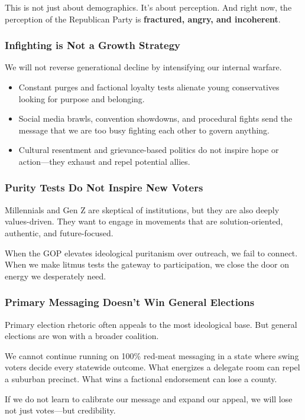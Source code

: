 This is not just about demographics. It’s about perception. And right now, the perception of the Republican Party is \textbf{fractured, angry, and incoherent}.

\subsubsection{Infighting is Not a Growth Strategy}
We will not reverse generational decline by intensifying our internal warfare.

\begin{itemize}
\item Constant purges and factional loyalty tests alienate young conservatives looking for purpose and belonging.
\item Social media brawls, convention showdowns, and procedural fights send the message that we are too busy fighting each other to govern anything.
\item Cultural resentment and grievance-based politics do not inspire hope or action—they exhaust and repel potential allies.
\end{itemize}

\subsubsection{Purity Tests Do Not Inspire New Voters}
Millennials and Gen Z are skeptical of institutions, but they are also deeply values-driven. They want to engage in movements that are solution-oriented, authentic, and future-focused.

When the GOP elevates ideological puritanism over outreach, we fail to connect. When we make litmus tests the gateway to participation, we close the door on energy we desperately need.

\subsubsection{Primary Messaging Doesn’t Win General Elections}
Primary election rhetoric often appeals to the most ideological base. But general elections are won with a broader coalition.

We cannot continue running on 100\% red-meat messaging in a state where swing voters decide every statewide outcome. What energizes a delegate room can repel a suburban precinct. What wins a factional endorsement can lose a county.

If we do not learn to calibrate our message and expand our appeal, we will lose not just votes—but credibility.

